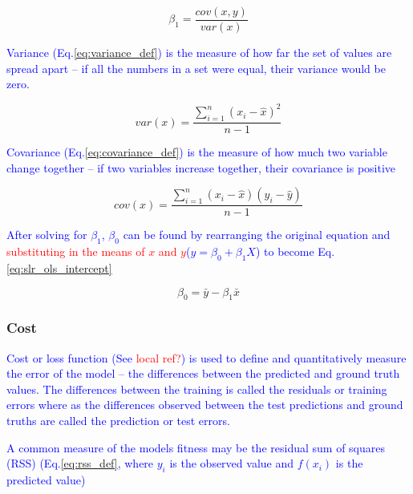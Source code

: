 \begin{equation}
{\beta_1 =  \frac{cov(x,y)}{var(x)}}
\label{eq:slr_ols_slope}
\end{equation}

\textcolor{blue}{Variance (Eq.\ref{eq:variance_def}) is the measure of how far the set of values are spread apart -- if all the numbers in a set were equal, their variance would be zero.}

\begin{equation}
{var(x) = \frac{\sum_{i=1}^{n}(x_i - \hat{x})^2}{n-1}}
\label{eq:variance_def}
\end{equation}


\textcolor{blue}{Covariance (Eq.\ref{eq:covariance_def}) is the measure of how much two variable change together -- if two variables increase together, their covariance is positive}

\begin{equation}
{cov(x) = \frac{\sum_{i=1}^{n}(x_i - \hat{x})(y_i - \hat{y})}{n-1}}
\label{eq:covariance_def}
\end{equation}

\textcolor{blue}{After solving for $\beta_1$, $\beta_0$ can be found by rearranging the original equation and \textcolor{red}{substituting in the means of $x$ and $y$}($y=\beta_0 + \beta_1 X$) to become Eq.\ref{eq:slr_ols_intercept}}

\begin{equation}
{\beta_0 =  \bar{y} - \beta_1 \bar{x}}
\label{eq:slr_ols_intercept}
\end{equation}

\subsubsection{Cost}

\textcolor{blue}{Cost or loss function (See \textcolor{red}{local ref?}) is used to define and quantitatively measure the error of the model -- the differences between the predicted and ground truth values. The differences between the training is called the residuals or training errors where as the differences observed between the test predictions and ground truths are called the prediction or test errors.}

\textcolor{blue}{A common measure of the models fitness may be the {residual sum of squares (RSS)} (Eq.\ref{eq:rss_def}, where $y_i$ is the observed value and $f(x_i)$ is the predicted value)}

